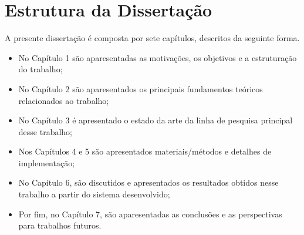 \section{Estrutura da Dissertação}

A presente dissertação é composta por sete capítulos, descritos da seguinte forma.
\begin{itemize}
\item No Capítulo 1 são aparesentadas as motivações, os objetivos e a estruturação do trabalho;
\item No Capítulo 2 são aparesentados os principais fundamentos teóricos relacionados ao trabalho;
\item No Capítulo 3 é apresentado o estado da arte da linha de pesquisa principal desse trabalho;
\item Nos Capítulos 4 e 5 são apresentados materiais/métodos e detalhes de implementação;
\item No Capítulo 6, são discutidos e apresentados os resultados obtidos nesse trabalho a partir do sistema desenvolvido;
\item Por fim, no Capítulo 7, são aparesentadas as conclusões e as perspectivas para trabalhos futuros.
\end{itemize}


